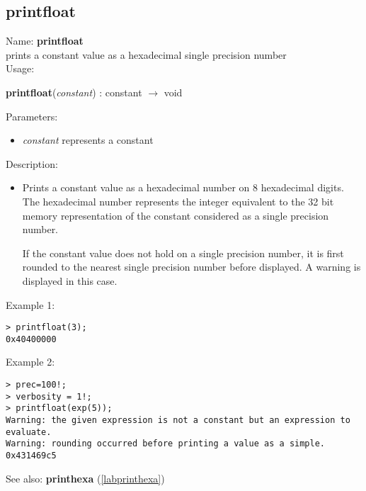 \subsection{printfloat}
\label{labprintfloat}
\noindent Name: \textbf{printfloat}\\
prints a constant value as a hexadecimal single precision number\\

\noindent Usage: 
\begin{center}
\textbf{printfloat}(\emph{constant}) : \textsf{constant} $\rightarrow$ \textsf{void}\\
\end{center}
Parameters: 
\begin{itemize}
\item \emph{constant} represents a constant
\end{itemize}
\noindent Description: \begin{itemize}

\item Prints a constant value as a hexadecimal number on 8 hexadecimal
   digits. The hexadecimal number represents the integer equivalent to
   the 32 bit memory representation of the constant considered as a
   single precision number.
    
   If the constant value does not hold on a single precision number, it
   is first rounded to the nearest single precision number before
   displayed. A warning is displayed in this case.
\end{itemize}
\noindent Example 1: 
\begin{center}\begin{minipage}{15cm}\begin{Verbatim}[frame=single]
> printfloat(3);
0x40400000
\end{Verbatim}
\end{minipage}\end{center}
\noindent Example 2: 
\begin{center}\begin{minipage}{15cm}\begin{Verbatim}[frame=single]
> prec=100!;
> verbosity = 1!;
> printfloat(exp(5));
Warning: the given expression is not a constant but an expression to evaluate.
Warning: rounding occurred before printing a value as a simple.
0x431469c5
\end{Verbatim}
\end{minipage}\end{center}
See also: \textbf{printhexa} (\ref{labprinthexa})
